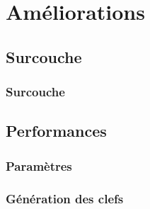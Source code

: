 \section{Améliorations}

\subsection{Surcouche}

\begin{frame}
\frametitle{Surcouche}
\end{frame}

\subsection{Performances}

\begin{frame}
\frametitle{Paramètres}
\end{frame}


\begin{frame}
\frametitle{Génération des clefs}
\end{frame}